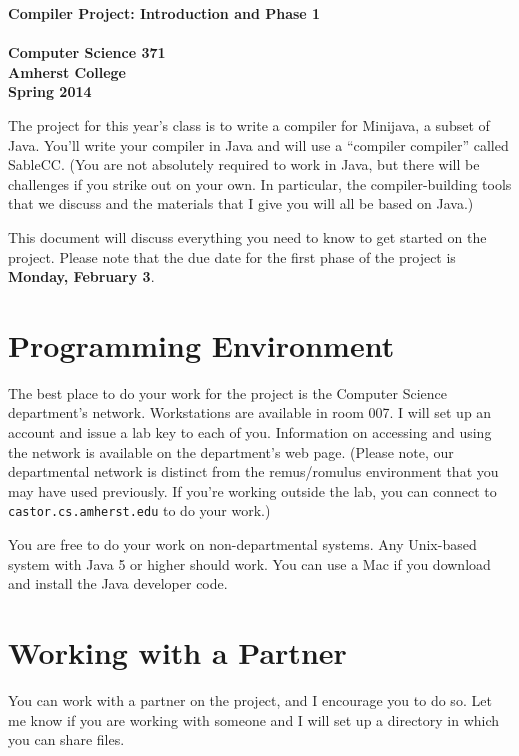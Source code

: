 \documentclass[11pt]{article}
\begin{document}
\begin{center}
\Large \bf Compiler Project:  Introduction and Phase 1 \\ \mbox{} \\
\large Computer Science 371 \\
\large Amherst College \\
\large Spring 2014
\end{center}

The project for this year's class is to write a compiler for Minijava, a subset of Java.  You'll write your compiler in Java and will use a ``compiler compiler'' called SableCC.  (You are not absolutely required to work in Java, but there will be challenges if you strike out on your own.  In particular, the compiler-building tools that we discuss and the materials that I give you will all be based on Java.)

This document will discuss everything you need to know to get started on the project.  Please note that the due date for the first phase of the project is {\bf Monday, February 3}.

\section{Programming Environment}
The best place to do your work for the project is the Computer Science department's network.  Workstations are available in room 007.  I will set up an account and issue a lab key to each of you.  Information on accessing and using the network is available on the department's web page.  (Please note, our departmental network is distinct from the remus/romulus environment that you may have used previously.  If you're working outside the lab, you can connect to \verb'castor.cs.amherst.edu' to do your work.)

You are free to do your work on non-departmental systems.  Any Unix-based system with Java 5 or higher should work.  You can use a Mac if you download and install the Java developer code.

\section{Working with a Partner}
You can work with a partner on the project, and I encourage you to do so.  Let me know if you are working with someone and I will set up a directory in which you can share files.
\end{document}

